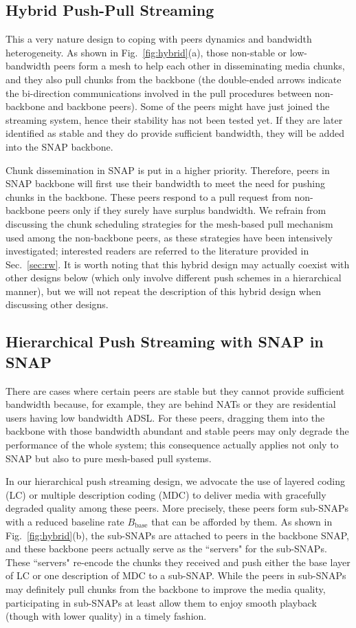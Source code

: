 \documentclass[conference]{IEEEtran}
\begin{document}
\subsection{Hybrid Push-Pull Streaming}
  This a very nature design to coping with peers dynamics and bandwidth heterogeneity. As shown in Fig.~\ref{fig:hybrid}(a), those non-stable or low-bandwidth peers form a mesh to help each other in disseminating media chunks, and they also pull chunks from the backbone (the double-ended arrows indicate the bi-direction communications involved in the pull procedures between non-backbone and backbone peers). Some of the peers might have just joined the streaming system, hence their stability has not been tested yet. If they are later identified as stable and they do provide sufficient bandwidth, they will be added into the SNAP backbone.

  Chunk dissemination in SNAP is put in a higher priority. Therefore, peers in SNAP backbone will first use their bandwidth to meet the need for pushing chunks in the backbone. These peers respond to a pull request from non-backbone peers only if they surely have surplus bandwidth. We refrain from discussing the chunk scheduling strategies for the mesh-based pull mechanism used among the non-backbone peers, as these strategies have been intensively investigated; interested readers are referred to the literature provided in Sec.~\ref{sec:rw}. It is worth noting that this hybrid design may actually coexist with other designs below (which only involve different push schemes in a hierarchical manner), but we will not repeat the description of this hybrid design when discussing other designs.

\subsection{Hierarchical Push Streaming with SNAP in SNAP}
  There are cases where certain peers are stable but they cannot provide sufficient bandwidth because, for example, they are behind NATs or they are residential users having low bandwidth ADSL. For these peers, dragging them into the backbone with those bandwidth abundant and stable peers may only degrade the performance of the whole system; this consequence actually applies not only to SNAP but also to pure mesh-based pull systems.

  In our hierarchical push streaming design, we advocate the use of layered coding (LC) \cite{WienCGHA-TCSVT07} or multiple description coding (MDC) \cite{Goyal-SPMag01} to deliver media with gracefully degraded quality among these peers. More precisely, these peers form sub-SNAPs with a reduced baseline rate $B_\mathrm{base}$ that can be afforded by them. As shown in Fig.~\ref{fig:hybrid}(b), the sub-SNAPs are attached to peers in the backbone SNAP, and these backbone peers actually serve as the ``servers" for the sub-SNAPs. These ``servers" re-encode the chunks they received and push either the base layer of LC or one description of MDC to a sub-SNAP. While the peers in sub-SNAPs may definitely pull chunks from the backbone to improve the media quality, participating in sub-SNAPs at least allow them to enjoy smooth playback (though with lower quality) in a timely fashion.
\end{document}
